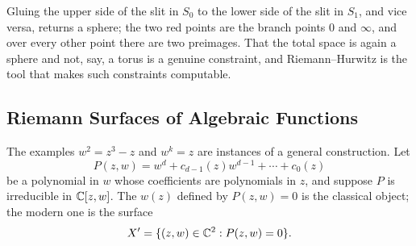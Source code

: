 \documentclass[a4paper]{scrartcl}
\newcommand{\Cinf}{\C_\infty}
\begin{document}
\begin{center}
\end{center}

Gluing the upper side of the slit in $S_0$ to the lower side of the slit in $S_1$, and
vice versa, returns a sphere; the two red points are the branch points $0$ and $\infty$,
and over every other point there are two preimages. That the total space is again a
sphere and not, say, a torus is
a genuine constraint, and Riemann--Hurwitz is the tool that makes such constraints
computable.

\subsection{Riemann Surfaces of Algebraic Functions}\label{subsec:algebraic}

The examples $w^2 = z^3 - z$ and $w^k = z$ are instances of a general construction. Let
$$
P(z,w) = w^d + c_{d-1}(z)w^{d-1} + \cdots + c_0(z)
$$
be a polynomial in $w$ whose coefficients are polynomials in $z$, and suppose $P$ is
irreducible in $\mathbb{C}[z,w]$. The  $w(z)$ defined by $P(z,w)=0$ is
the classical object; the modern one is the surface
$$
X' = \{(z,w) \in \mathbb{C}^2 : P(z,w) = 0\}.
$$
\end{document}
